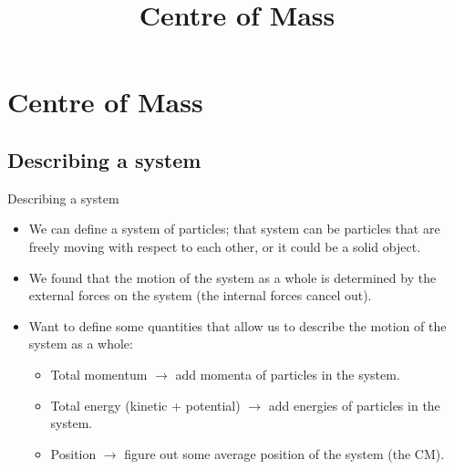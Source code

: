 \documentclass[aspectratio=169,
hyperref={colorlinks,urlcolor=blue}
]{beamer}
\begin{document}








\section{Centre of Mass}
\label{sec:centreofmass}
\title{Centre of Mass}
\author{\insertsubsection}


\begin{frame}
\titlepage
\thispagestyle{empty}
\end{frame}










\subsection{Describing a system}
\label{subsec:describingasystem}
\begin{frame}{Describing a system}
\begin{itemize}
\item We can define a system of particles; that system can be particles that are freely moving with respect to each other, or it could be a solid object.
\item We found that the motion of the system as a whole is determined by the external forces on the system (the internal forces cancel out).
\item Want to define some quantities that allow us to describe the motion of the system as a whole:
\begin{itemize}
\item Total momentum $\rightarrow$ add momenta of particles in the system.
\item Total energy (kinetic + potential) $\rightarrow$ add energies of particles in the system.
\item Position $\rightarrow$ figure out some average position of the system (the CM).
\end{itemize}

\end{itemize}

\end{frame}
\end{document}
